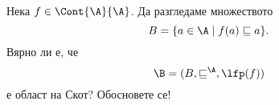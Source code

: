 

\begin{problem}%
  Нека $f \in \Cont{\A}{\A}$.
  Да разгледаме множеството 
  \[B = \{a \in \A \mid f(a) \sqsubseteq a\}.\]
  Вярно ли е, че 
  \[\B = (B, \sqsubseteq^\A, \lfp(f))\] е област на Скот?
  Обосновете се!
\end{problem}



